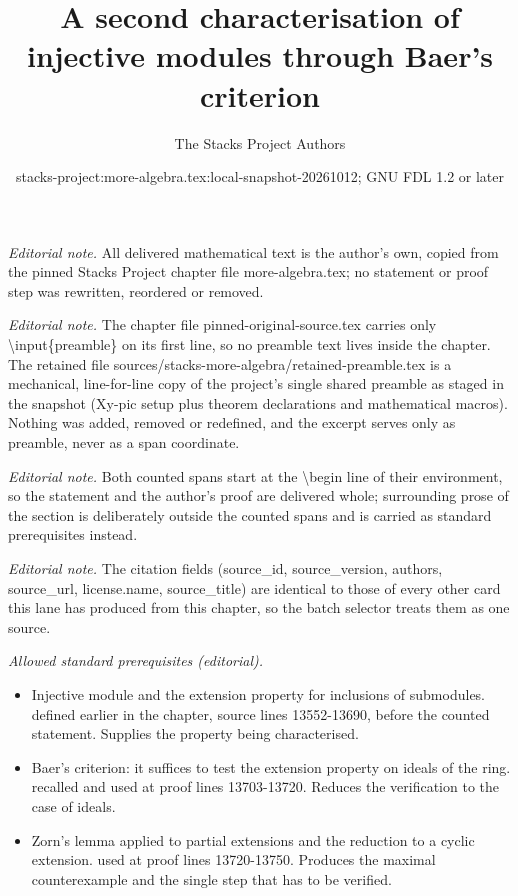 \documentclass[10pt,a4paper]{amsart}
\title{A second characterisation of injective modules through Baer's criterion}
\author{The Stacks Project Authors}
\date{stacks-project:more-algebra.tex:local-snapshot-20261012; GNU FDL 1.2 or later}
\theoremstyle{plain}
\theoremstyle{definition}
\theoremstyle{remark}
\numberwithin{equation}{subsection}
\begin{document}
\maketitle
\setcounter{subsection}{1}
\noindent\textit{Editorial note.} All delivered mathematical text is the author's own, copied from the pinned Stacks Project chapter file more-algebra.tex; no statement or proof step was rewritten, reordered or removed.\par\medskip
\noindent\textit{Editorial note.} The chapter file pinned-original-source.tex carries only \textbackslash{}input\{preamble\} on its first line, so no preamble text lives inside the chapter. The retained file sources/stacks-more-algebra/retained-preamble.tex is a mechanical, line-for-line copy of the project's single shared preamble as staged in the snapshot (Xy-pic setup plus theorem declarations and mathematical macros). Nothing was added, removed or redefined, and the excerpt serves only as preamble, never as a span coordinate.\par\medskip
\noindent\textit{Editorial note.} Both counted spans start at the \textbackslash{}begin line of their environment, so the statement and the author's proof are delivered whole; surrounding prose of the section is deliberately outside the counted spans and is carried as standard prerequisites instead.\par\medskip
\noindent\textit{Editorial note.} The citation fields (source\_id, source\_version, authors, source\_url, license.name, source\_title) are identical to those of every other card this lane has produced from this chapter, so the batch selector treats them as one source.\par\medskip
\noindent\textit{Allowed standard prerequisites (editorial).}\begin{itemize}
\item Injective module and the extension property for inclusions of submodules. defined earlier in the chapter, source lines 13552-13690, before the counted statement. Supplies the property being characterised.
\item Baer's criterion: it suffices to test the extension property on ideals of the ring. recalled and used at proof lines 13703-13720. Reduces the verification to the case of ideals.
\item Zorn's lemma applied to partial extensions and the reduction to a cyclic extension. used at proof lines 13720-13750. Produces the maximal counterexample and the single step that has to be verified.
\end{itemize}\medskip
\end{document}
